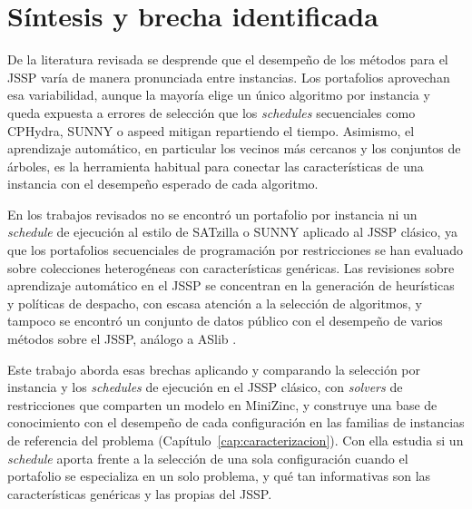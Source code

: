 \section{Síntesis y brecha identificada}
\label{sec:brecha}

De la literatura revisada se desprende que el desempeño de los métodos para el
JSSP varía de manera pronunciada entre instancias. Los portafolios aprovechan
esa variabilidad, aunque la mayoría elige un único algoritmo por instancia y
queda expuesta a errores de selección que los \textit{schedules} secuenciales
como CPHydra, SUNNY o aspeed mitigan repartiendo el tiempo. Asimismo, el
aprendizaje automático, en particular los vecinos más cercanos y los conjuntos
de árboles, es la herramienta habitual para conectar las características de una
instancia con el desempeño esperado de cada algoritmo.

En los trabajos revisados no se encontró un portafolio por instancia ni un
\textit{schedule} de ejecución al estilo de SATzilla o SUNNY aplicado al JSSP
clásico, ya que los portafolios secuenciales de programación por restricciones
se han evaluado sobre colecciones heterogéneas con características genéricas.
Las revisiones sobre aprendizaje automático en el JSSP se concentran en la
generación de heurísticas y políticas de despacho, con escasa atención a la
selección de algoritmos, y tampoco se encontró un conjunto de datos público con
el desempeño de varios métodos sobre el JSSP, análogo a ASlib
\citep{bischl2016aslib}.

Este trabajo aborda esas brechas aplicando y comparando la selección por
instancia y los \textit{schedules} de ejecución en el JSSP clásico, con
\textit{solvers} de restricciones que comparten un modelo en MiniZinc, y
construye una base de conocimiento con el desempeño de cada configuración en
las familias de instancias de referencia del problema
(Capítulo~\ref{cap:caracterizacion}). Con ella estudia si un
\textit{schedule} aporta frente a la selección de una sola configuración
cuando el portafolio se especializa en un solo problema, y qué tan
informativas son las características genéricas y las propias del JSSP.
